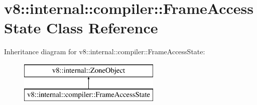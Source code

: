 \hypertarget{classv8_1_1internal_1_1compiler_1_1_frame_access_state}{}\section{v8\+:\+:internal\+:\+:compiler\+:\+:Frame\+Access\+State Class Reference}
\label{classv8_1_1internal_1_1compiler_1_1_frame_access_state}
Inheritance diagram for v8\+:\+:internal\+:\+:compiler\+:\+:Frame\+Access\+State\+:\begin{figure}[H]
\begin{center}
\leavevmode
\includegraphics[height=2.000000cm]{classv8_1_1internal_1_1compiler_1_1_frame_access_state}
\end{center}
\end{figure}
